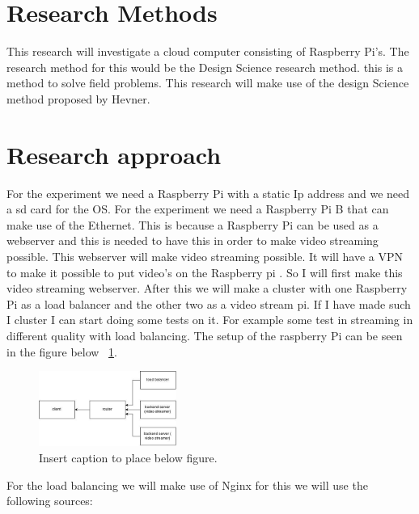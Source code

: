 \documentclass{sig-alternate-br}
\begin{document}
\section{Research Methods}
This research will investigate a cloud computer consisting of Raspberry Pi's. The research method for this would be the Design Science research method. this is a method to solve field problems. This research will make use of the design Science method proposed by Hevner\cite{hevner:2007}.

\section{Research approach}
For the experiment we need a Raspberry Pi with a static Ip address and we need a sd card for the OS. For the experiment we need a Raspberry Pi B that can make use of the Ethernet. This is because a Raspberry Pi can be used as a webserver and this is needed to have this in order to make video streaming possible. This webserver will make video streaming possible. It will have a VPN to make it possible to put video's on the Raspberry pi \cite{VPN:2014}. 
So I will first make this video streaming webserver. 
After this we will make a cluster with one Raspberry Pi as a load balancer and the other two as a video stream pi. If I have made such I cluster I can start doing some tests on it. For example some test in streaming in different quality with load balancing. The setup of the raspberry Pi can be seen in the figure below ~\ref{fig:setup}.

\begin{figure}[H]
\centering 
\includegraphics[width=0.4\textwidth]{raspberry pi setup.jpg}
\caption{Insert caption to place below figure.}
\label{fig:setup} %
\end{figure}
For the load balancing we will make use of Nginx for this we will use the following sources:
\cite{nginx-load-balancing, nginx-load-balancing-2}
\end{document}
